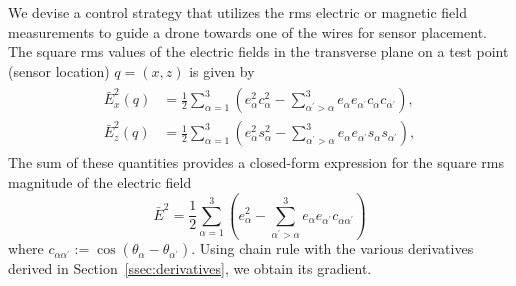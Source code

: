 We devise a control strategy that utilizes the rms electric or magnetic field
measurements to guide a drone towards one of the wires for sensor placement.
%
%
The square rms values of the electric fields in the transverse plane on a test
point (sensor location) $q = (x, z)$ is given by 
%
\begin{align}
    \begin{split}
        \bar{E}_{x}^2(q) &=
        \frac{1}{2}\sum_{\alpha=1}^3\left(e_{\alpha}^2c_\alpha^2 -
            \sum_{\alpha^\prime > \alpha}^3e_{\alpha}
    e_{\alpha^\prime} c_\alpha c_{\alpha^\prime} \right), \\
        \bar{E}_{z}^2(q) &= \frac{1}{2}\sum_{\alpha=1}^3\left(e_{\alpha
            }^2 s_\alpha^2 - \sum_{\alpha^\prime > \alpha}^3e_{\alpha}
    e_{\alpha^\prime} s_\alpha s_{\alpha^\prime}\right),
    \end{split}
    \label{eq:rms_xz}
\end{align}
%
The sum of these quantities provides a closed-form expression for the square rms
magnitude of the electric field
%
\begin{equation}
    \bar{E}^2 = \frac{1}{2}\sum_{\alpha=1}^3\left(e_\alpha^2 -
    \sum_{\alpha^\prime > \alpha}^3 e_\alpha
    e_{\alpha^\prime} c_{\alpha \alpha^\prime}\right)
    \label{eq:rms}
\end{equation}
%
where $c_{\alpha \alpha^\prime} := \cos{(\theta_\alpha -
\theta_{\alpha^\prime})}$. Using chain rule with the various derivatives derived
in Section~\ref{ssec:derivatives}, we obtain its gradient.
%
